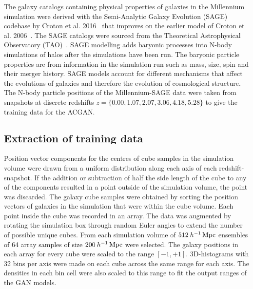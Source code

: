 \documentclass[twocolumn]{article}
\numberwithin{equation}{section}
\begin{document}
The galaxy catalogs containing physical properties of galaxies in the Millennium simulation were derived with the 
Semi-Analytic Galaxy Evolution (SAGE) codebase by Croton et al. 2016~\cite{Croton2016} that improves on the earlier 
model of Croton et al. 2006~\cite{Croton2006}. The SAGE catalogs were sourced from the Theoretical Astrophysical 
Observatory (TAO)~\cite{TAO}. SAGE modelling adds baryonic processes into N-body simulations of halos after the 
simulations have been run. The baryonic particle properties are from information in the simulation run such as mass, 
size, spin and their merger history. SAGE models account for different mechanisms that affect the evolutions of 
galaxies and therefore the evolution of cosmological structure. The N-body particle positions of the Millennium-SAGE 
data were taken from snapshots at discrete redshifts $z=\{0.00, 1.07, 2.07, 3.06, 4.18, 5.28\}$ to give the training 
data for the ACGAN. 


\subsection{Extraction of training data} 
Position vector components for the centres of cube samples in the simulation volume were drawn from a uniform distribution 
along each axis of each redshift-snapshot. If the addition or subtraction of half the side length of the cube to any of 
the components resulted in a point outside of the simulation volume, the point was discarded. The galaxy cube samples were 
obtained by sorting the position vectors of galaxies in the simulation that were within the cube volume. Each point inside 
the cube was recorded in an array. The data was augmented by rotating the simulation box through random Euler angles to 
extend the number of possible unique cubes. From each simulation volume of $512 \: h^{-1} \,\textup{Mpc}$ ensembles of 64 
array samples of size $200 \: h^{-1} \,\textup{Mpc}$ were selected. The galaxy positions in each array for every cube were 
scaled to the range $[-1,+1]$. 3D-histograms with 32 bins per axis were made on each cube across the same range for each 
axis. The densities in each bin cell were also scaled to this range to fit the output ranges of the GAN models. 
\end{document}
